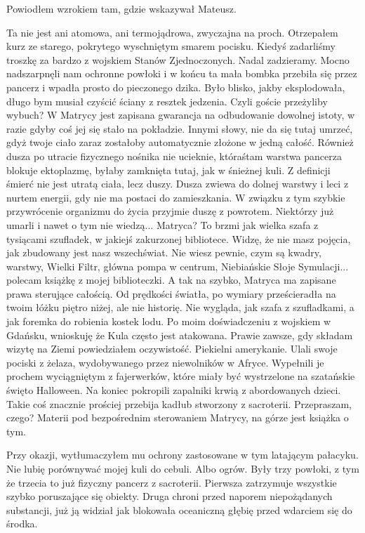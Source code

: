 Powiodłem wzrokiem tam, gdzie wskazywał Mateusz.
\begin{dialogue}
\ds{} Ta nie jest ani atomowa, ani termojądrowa, zwyczajna na proch. \dm{} Otrzepałem kurz ze starego, pokrytego wyschniętym smarem pocisku. \dm{} 
Kiedyś zadarliśmy troszkę za bardzo z wojskiem Stanów Zjednoczonych. Nadal zadzieramy.
Mocno nadszarpnęli nam ochronne powłoki i w końcu ta mała bombka przebiła się przez pancerz i wpadła prosto do pieczonego dzika.
Było blisko, jakby eksplodowała, długo bym musiał czyścić ściany z resztek jedzenia.
\ds{} Czyli goście przeżyliby wybuch?
\ds{} W Matrycy jest zapisana gwarancja na odbudowanie dowolnej istoty, w razie gdyby coś jej się stało na pokładzie. 
Innymi słowy, nie da się tutaj umrzeć, gdyż twoje ciało zaraz zostałoby automatycznie złożone w jedną całość.
Również dusza po utracie fizycznego nośnika nie ucieknie, któraśtam warstwa pancerza blokuje ektoplazmę, byłaby zamknięta tutaj, jak w śnieżnej kuli.
Z definicji śmierć nie jest utratą ciała, lecz duszy. Dusza zwiewa do dolnej warstwy i leci z nurtem energii, gdy nie ma postaci do zamieszkania. 
W związku z tym szybkie przywrócenie organizmu do życia przyjmie duszę z powrotem.
Niektórzy już umarli i nawet o tym nie wiedzą...
\ds{} Matryca? To brzmi jak wielka szafa z tysiącami szufladek, w jakiejś zakurzonej bibliotece.
\ds{} Widzę, że nie masz pojęcia, jak zbudowany jest nasz wszechświat. Nie wiesz pewnie, czym są kwadry, warstwy, Wielki Filtr, główna pompa w centrum, 
Niebiańskie Słoje Symulacji... polecam książkę z mojej biblioteczki.
A tak na szybko, Matryca ma zapisane prawa sterujące całością. Od prędkości światła, po wymiary prześcieradła na twoim łóżku piętro niżej, ale nie historię.
Nie wygląda, jak szafa z szufladkami, a jak foremka do robienia kostek lodu.
\ds{} Po moim doświadczeniu z wojskiem w Gdańsku, wnioskuję że Kula często jest atakowana.
\ds{} Prawie zawsze, gdy składam wizytę na Ziemi \dm{} powiedziałem oczywistość. \dm{} Piekielni amerykanie. 
Ulali swoje pociski z żelaza, wydobywanego przez niewolników w Afryce.
Wypełnili je prochem wyciągniętym z fajerwerków, które miały być wystrzelone na szatańskie święto Halloween. 
Na koniec pokropili zapalniki krwią z abordowanych dzieci.
Takie coś znacznie prościej przebija kadłub stworzony z sacroterii.
\ds{} Przepraszam, czego?
\ds{} Materii pod bezpośrednim sterowaniem Matrycy, na górze jest książka o tym.
\end{dialogue}

Przy okazji, wytłumaczyłem mu ochrony zastosowane w tym latającym pałacyku. 
Nie lubię porównywać mojej kuli do cebuli. Albo ogrów.
Były trzy powłoki, z tym że trzecia to już fizyczny pancerz z sacroterii.
Pierwsza zatrzymuje wszystkie szybko poruszające się obiekty.
Druga chroni przed naporem niepożądanych substancji, już ją widział jak blokowała oceaniczną głębię przed wdarciem się do środka.


